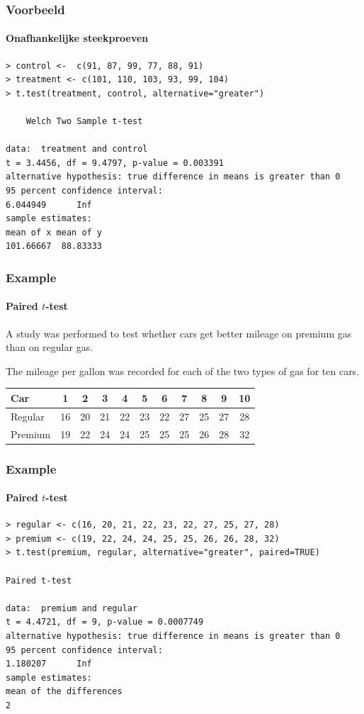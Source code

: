 \documentclass{beamer}
\begin{document}
\begin{frame}[fragile]
  \frametitle{Voorbeeld}
  \framesubtitle{Onafhankelijke steekproeven}

\footnotesize
\begin{verbatim}
> control <-  c(91, 87, 99, 77, 88, 91)
> treatment <- c(101, 110, 103, 93, 99, 104)
> t.test(treatment, control, alternative="greater")

	Welch Two Sample t-test

data:  treatment and control
t = 3.4456, df = 9.4797, p-value = 0.003391
alternative hypothesis: true difference in means is greater than 0
95 percent confidence interval:
6.044949      Inf
sample estimates:
mean of x mean of y 
101.66667  88.83333 
\end{verbatim}
\end{frame}


\begin{frame}
  \frametitle{Example}
  \framesubtitle{Paired $t$-test}
  
  A study was performed to test whether cars get better mileage on premium gas than on regular gas. 
  
  The mileage per gallon was recorded for each of the two types of gas for ten cars.
  
  \vspace{.5cm}
  \centering
  \begin{tabular}{|l|c|c|c|c|c|c|c|c|c|c|}
  	\hline
  	Car     & 1  & 2  & 3  & 4  & 5  & 6  & 7  & 8  & 9  & 10 \\ \hline
  	Regular & 16 & 20 & 21 & 22 & 23 & 22 & 27 & 25 & 27 & 28 \\ \hline
  	Premium & 19 & 22 & 24 & 24 & 25 & 25 & 25 & 26 & 28 & 32 \\ \hline
  \end{tabular} 
\end{frame}

\begin{frame}[fragile]
  \frametitle{Example}
\framesubtitle{Paired $t$-test}
  
\footnotesize
\begin{verbatim}
> regular <- c(16, 20, 21, 22, 23, 22, 27, 25, 27, 28)
> premium <- c(19, 22, 24, 24, 25, 25, 26, 26, 28, 32)
> t.test(premium, regular, alternative="greater", paired=TRUE)

Paired t-test

data:  premium and regular
t = 4.4721, df = 9, p-value = 0.0007749
alternative hypothesis: true difference in means is greater than 0
95 percent confidence interval:
1.180207      Inf
sample estimates:
mean of the differences 
2
\end{verbatim}
\end{frame}
\end{document}
